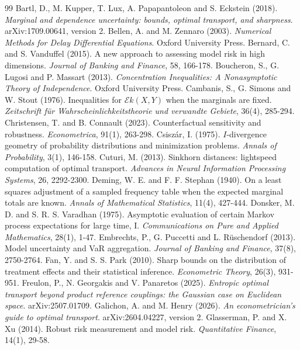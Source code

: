 \documentclass[11pt,a4paper]{article}
\theoremstyle{notesplain}
\theoremstyle{notesupright}
\numberwithin{equation}{section}
\begin{document}
\begin{thebibliography}{99}\small
{} Bartl, D., M. Kupper, T. Lux, A. Papapantoleon and S. Eckstein (2018). \emph{Marginal and dependence uncertainty: bounds, optimal transport, and sharpness}. arXiv:1709.00641, version 2.
 Bellen, A. and M. Zennaro (2003). \emph{Numerical Methods for Delay Differential Equations}. Oxford University Press.
 Bernard, C. and S. Vanduffel (2015). A new approach to assessing model risk in high dimensions. \emph{Journal of Banking and Finance}, 58, 166-178.
 Boucheron, S., G. Lugosi and P. Massart (2013). \emph{Concentration Inequalities: A Nonasymptotic Theory of Independence}. Oxford University Press.
 Cambanis, S., G. Simons and W. Stout (1976). Inequalities for $\mathcal Ek(X,Y)$ when the marginals are fixed. \emph{Zeitschrift für Wahrscheinlichkeitstheorie und verwandte Gebiete}, 36(4), 285-294.
 Christensen, T. and B. Connault (2023). Counterfactual sensitivity and robustness. \emph{Econometrica}, 91(1), 263-298.
 Csiszár, I. (1975). $I$-divergence geometry of probability distributions and minimization problems. \emph{Annals of Probability}, 3(1), 146-158.
 Cuturi, M. (2013). Sinkhorn distances: lightspeed computation of optimal transport. \emph{Advances in Neural Information Processing Systems}, 26, 2292-2300.
 Deming, W. E. and F. F. Stephan (1940). On a least squares adjustment of a sampled frequency table when the expected marginal totals are known. \emph{Annals of Mathematical Statistics}, 11(4), 427-444.
 Donsker, M. D. and S. R. S. Varadhan (1975). Asymptotic evaluation of certain Markov process expectations for large time, I. \emph{Communications on Pure and Applied Mathematics}, 28(1), 1-47.
 Embrechts, P., G. Puccetti and L. Rüschendorf (2013). Model uncertainty and VaR aggregation. \emph{Journal of Banking and Finance}, 37(8), 2750-2764.
 Fan, Y. and S. S. Park (2010). Sharp bounds on the distribution of treatment effects and their statistical inference. \emph{Econometric Theory}, 26(3), 931-951.
 Freulon, P., N. Georgakis and V. Panaretos (2025). \emph{Entropic optimal transport beyond product reference couplings: the Gaussian case on Euclidean space}. arXiv:2507.01709.
 Galichon, A. and M. Henry (2026). \emph{An econometrician's guide to optimal transport}. arXiv:2604.04227, version 2.
 Glasserman, P. and X. Xu (2014). Robust risk measurement and model risk. \emph{Quantitative Finance}, 14(1), 29-58.

\end{thebibliography}
\end{document}
